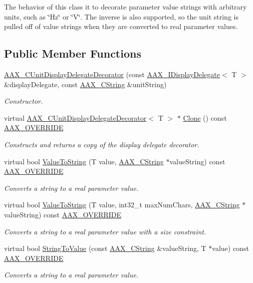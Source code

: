 The behavior of this class it to decorate parameter value strings with arbitrary units, such as \char`\"{}\+Hz\char`\"{} or \char`\"{}\+V\char`\"{}. The inverse is also supported, so the unit string is pulled off of value strings when they are converted to real parameter values. \subsection*{Public Member Functions}
\begin{DoxyCompactItemize}
\item 
\hyperlink{a00045_ad1ade911fb13a394a65a26e159035318}{A\+A\+X\+\_\+\+C\+Unit\+Display\+Delegate\+Decorator} (const \hyperlink{a00092}{A\+A\+X\+\_\+\+I\+Display\+Delegate}$<$ T $>$ \&display\+Delegate, const \hyperlink{a00042}{A\+A\+X\+\_\+\+C\+String} \&unit\+String)
\begin{DoxyCompactList}\small\item\em Constructor. \end{DoxyCompactList}\item 
virtual \hyperlink{a00045}{A\+A\+X\+\_\+\+C\+Unit\+Display\+Delegate\+Decorator}$<$ T $>$ $\ast$ \hyperlink{a00045_ad987fdc5423673b664ce099c6f27bf06}{Clone} () const \hyperlink{a00149_ac2f24a5172689ae684344abdcce55463}{A\+A\+X\+\_\+\+O\+V\+E\+R\+R\+I\+D\+E}
\begin{DoxyCompactList}\small\item\em Constructs and returns a copy of the display delegate decorator. \end{DoxyCompactList}\item 
virtual bool \hyperlink{a00045_a8531395e74327b93e210fd0aafaed3f7}{Value\+To\+String} (T value, \hyperlink{a00042}{A\+A\+X\+\_\+\+C\+String} $\ast$value\+String) const \hyperlink{a00149_ac2f24a5172689ae684344abdcce55463}{A\+A\+X\+\_\+\+O\+V\+E\+R\+R\+I\+D\+E}
\begin{DoxyCompactList}\small\item\em Converts a string to a real parameter value. \end{DoxyCompactList}\item 
virtual bool \hyperlink{a00045_a2a5d19b4d616c56e2c5e671cd3741ad3}{Value\+To\+String} (T value, int32\+\_\+t max\+Num\+Chars, \hyperlink{a00042}{A\+A\+X\+\_\+\+C\+String} $\ast$value\+String) const \hyperlink{a00149_ac2f24a5172689ae684344abdcce55463}{A\+A\+X\+\_\+\+O\+V\+E\+R\+R\+I\+D\+E}
\begin{DoxyCompactList}\small\item\em Converts a string to a real parameter value with a size constraint. \end{DoxyCompactList}\item 
virtual bool \hyperlink{a00045_a4577b27d63067a75deead21c25f1b932}{String\+To\+Value} (const \hyperlink{a00042}{A\+A\+X\+\_\+\+C\+String} \&value\+String, T $\ast$value) const \hyperlink{a00149_ac2f24a5172689ae684344abdcce55463}{A\+A\+X\+\_\+\+O\+V\+E\+R\+R\+I\+D\+E}
\begin{DoxyCompactList}\small\item\em Converts a string to a real parameter value. \end{DoxyCompactList}\end{DoxyCompactItemize}
